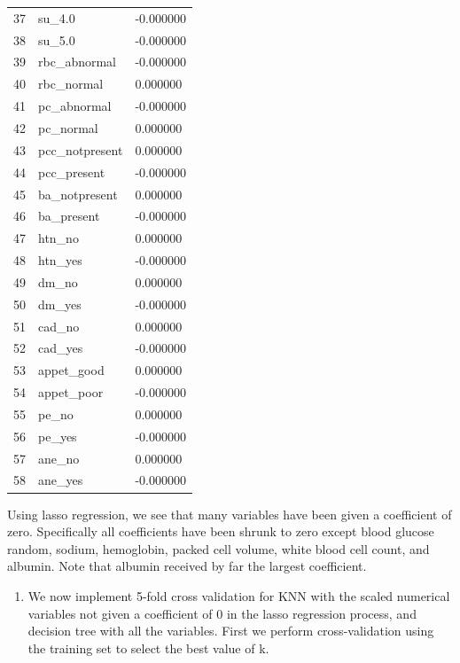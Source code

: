 \documentclass[
  11pt,
  letterpaper,
  DIV=11,
  numbers=noendperiod]{scrartcl}
\providecommand{\tightlist}{%
  \setlength{\itemsep}{0pt}\setlength{\parskip}{0pt}}\usepackage{longtable,booktabs,array}
\begin{document}
\begin{longtable}[]{@{}lll@{}}
37 & su\_4.0 & -0.000000 \\
38 & su\_5.0 & -0.000000 \\
39 & rbc\_abnormal & -0.000000 \\
40 & rbc\_normal & 0.000000 \\
41 & pc\_abnormal & -0.000000 \\
42 & pc\_normal & 0.000000 \\
43 & pcc\_notpresent & 0.000000 \\
44 & pcc\_present & -0.000000 \\
45 & ba\_notpresent & 0.000000 \\
46 & ba\_present & -0.000000 \\
47 & htn\_no & 0.000000 \\
48 & htn\_yes & -0.000000 \\
49 & dm\_no & 0.000000 \\
50 & dm\_yes & -0.000000 \\
51 & cad\_no & 0.000000 \\
52 & cad\_yes & -0.000000 \\
53 & appet\_good & 0.000000 \\
54 & appet\_poor & -0.000000 \\
55 & pe\_no & 0.000000 \\
56 & pe\_yes & -0.000000 \\
57 & ane\_no & 0.000000 \\
58 & ane\_yes & -0.000000 \\
\end{longtable}

Using lasso regression, we see that many variables have been given a
coefficient of zero. Specifically all coefficients have been shrunk to
zero except blood glucose random, sodium, hemoglobin, packed cell
volume, white blood cell count, and albumin. Note that albumin received
by far the largest coefficient.

\begin{enumerate}
\def\labelenumi{\arabic{enumi}.}
\setcounter{enumi}{11}
\tightlist
\item
  We now implement 5-fold cross validation for KNN with the scaled
  numerical variables not given a coefficient of 0 in the lasso
  regression process, and decision tree with all the variables. First we
  perform cross-validation using the training set to select the best
  value of k.
\end{enumerate}
\end{document}
